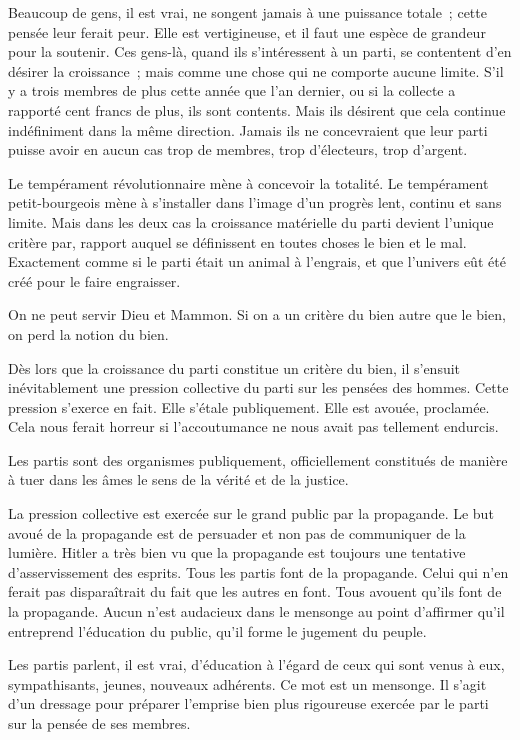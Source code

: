 \documentclass[french,twoside]{book} %
\begin{document}
Beaucoup de gens, il est vrai, ne songent jamais à une puissance totale ; cette pensée leur ferait peur. Elle est vertigineuse, et il faut une espèce de grandeur pour la soutenir. Ces gens-là, quand ils s’intéressent à un parti, se contentent d’en désirer la croissance ; mais comme une chose qui ne comporte aucune limite. S’il y a trois membres de plus cette année que l’an dernier, ou si la collecte a rapporté cent francs de plus, ils sont contents. Mais ils désirent que cela continue indéfiniment dans la même direction. Jamais ils ne concevraient que leur parti puisse avoir en aucun cas trop de membres, trop d’électeurs, trop d’argent.\par
Le tempérament révolutionnaire mène à concevoir la totalité. Le tempérament petit-bourgeois mène à s’installer dans l’image d’un progrès lent, continu et sans limite. Mais dans les deux cas la croissance matérielle du parti devient l’unique critère par, rapport auquel se définissent en toutes choses le bien et le mal. Exactement comme si le parti était un animal à l’engrais, et que l’univers eût été créé pour le faire engraisser.\par
On ne peut servir Dieu et Mammon. Si on a un critère du bien autre que le bien, on perd la notion du bien.\par
Dès lors que la croissance du parti constitue un critère du bien, il s’ensuit inévitablement une pression collective du parti sur les pensées des hommes. Cette pression s’exerce en fait. Elle s’étale publiquement. Elle est avouée, proclamée. Cela nous ferait horreur si l’accoutumance ne nous avait pas tellement endurcis.\par
Les partis sont des organismes publiquement, officiellement constitués de manière à tuer dans les âmes le sens de la vérité et de la justice.\par
La pression collective est exercée sur le grand public par la propagande. Le but avoué de la propagande est de persuader et non pas de communiquer de la lumière. Hitler a très bien vu que la propagande est toujours une tentative d’asservissement des esprits. Tous les partis font de la propagande. Celui qui n’en ferait pas disparaîtrait du fait que les autres en font. Tous avouent qu’ils font de la propagande. Aucun n’est audacieux dans le mensonge au point d’affirmer qu’il entreprend l’éducation du public, qu’il forme le jugement du peuple.\par
Les partis parlent, il est vrai, d’éducation à l’égard de ceux qui sont venus à eux, sympathisants, jeunes, nouveaux adhérents. Ce mot est un mensonge. Il s’agit d’un dressage pour préparer l’emprise bien plus rigoureuse exercée par le parti sur la pensée de ses membres.\par
\end{document}
